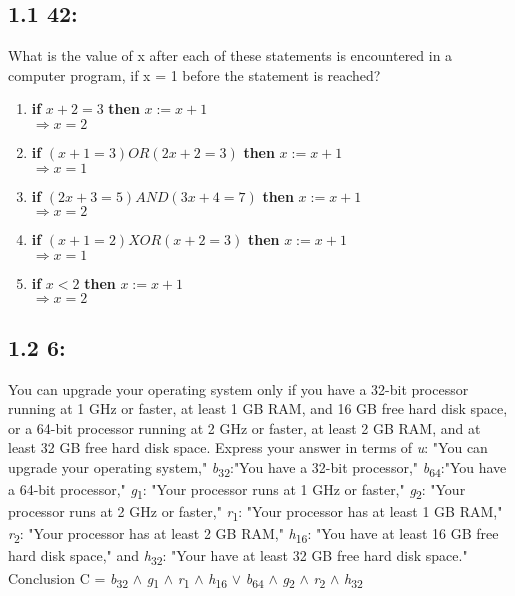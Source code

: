 \documentclass[12pt,en,a4paper]{article}
\begin{document}
	\subsection*{1.1 42:}
	What is the value of x after each of these statements is encountered in a computer program, if x = 1 before the
	statement is reached?\\
	\begin{enumerate}[label=(\alph*)]
		\item \textbf{if} $x+2=3$ \textbf{then} $x:=x+1$\\
		$\Rightarrow x=2$
		\item \textbf{if} $(x+1 =3)OR(2x+2=3)$ \textbf{then} $x:=x+1$\\
		$\Rightarrow x=1$
		\item \textbf{if} $(2x+3=5)AND(3x+4=7)$ \textbf{then} $x:=x+1$\\
		$\Rightarrow x=2$
		\item \textbf{if} $(x+1=2)XOR(x+2=3)$ \textbf{then} $x:=x+1$\\
		$\Rightarrow x=1$
		\item \textbf{if} $x<2$ \textbf{then} $x:=x+1$\\
		$\Rightarrow x=2$
	\end{enumerate}
	\subsection*{1.2 6:}
	You can upgrade your operating system only if you have a 32-bit processor running at 1 GHz or faster, at least 1 GB RAM, and 16 GB free hard disk space, or a 64-bit processor running at 2 GHz or faster, at least 2 GB RAM, and at least 32 GB free hard disk space. Express your answer in terms of \textit{u}: "You can upgrade your operating system," \textit{b}\textsubscript{32}:"You have a 32-bit processor," \textit{b}\textsubscript{64}:"You have a 64-bit processor," \textit{g}\textsubscript{1}: "Your processor runs at 1 GHz or faster," \textit{g}\textsubscript{2}: "Your processor runs at 2 GHz or faster," \textit{r}\textsubscript{1}: "Your processor has at least 1 GB RAM," \textit{r}\textsubscript{2}: "Your processor has at least 2 GB RAM," \textit{h}\textsubscript{16}: "You have at least 16 GB free hard disk space," and \textit{h}\textsubscript{32}: "Your have at least 32 GB free hard disk space."\\
	
	Conclusion C = \textit{b}\textsubscript{32} $\wedge$ \textit{g}\textsubscript{1} $\wedge$ \textit{r}\textsubscript{1} $\wedge$ \textit{h}\textsubscript{16} $\vee$ \textit{b}\textsubscript{64} $\wedge$ \textit{g}\textsubscript{2} $\wedge$ \textit{r}\textsubscript{2} $\wedge$ \textit{h}\textsubscript{32}
\end{document}
